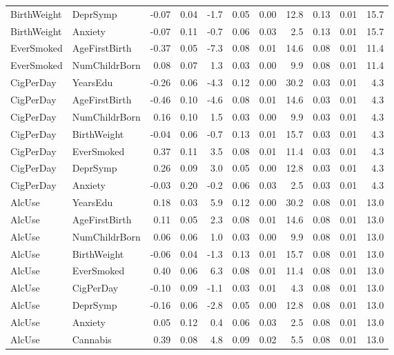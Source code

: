 \begin{longtable}{llrrrrrrrrr}
  BirthWeight & DeprSymp & -0.07 & 0.04 & -1.7 & 0.05 & 0.00 & 12.8 & 0.13 & 0.01 & 15.7 \\ 
  BirthWeight & Anxiety & -0.07 & 0.11 & -0.7 & 0.06 & 0.03 & 2.5 & 0.13 & 0.01 & 15.7 \\ 
  EverSmoked & AgeFirstBirth & -0.37 & 0.05 & -7.3 & 0.08 & 0.01 & 14.6 & 0.08 & 0.01 & 11.4 \\ 
  EverSmoked & NumChildrBorn & 0.08 & 0.07 & 1.3 & 0.03 & 0.00 & 9.9 & 0.08 & 0.01 & 11.4 \\ 
  CigPerDay & YearsEdu & -0.26 & 0.06 & -4.3 & 0.12 & 0.00 & 30.2 & 0.03 & 0.01 & 4.3 \\ 
  CigPerDay & AgeFirstBirth & -0.46 & 0.10 & -4.6 & 0.08 & 0.01 & 14.6 & 0.03 & 0.01 & 4.3 \\ 
  CigPerDay & NumChildrBorn & 0.16 & 0.10 & 1.5 & 0.03 & 0.00 & 9.9 & 0.03 & 0.01 & 4.3 \\ 
  CigPerDay & BirthWeight & -0.04 & 0.06 & -0.7 & 0.13 & 0.01 & 15.7 & 0.03 & 0.01 & 4.3 \\ 
  CigPerDay & EverSmoked & 0.37 & 0.11 & 3.5 & 0.08 & 0.01 & 11.4 & 0.03 & 0.01 & 4.3 \\ 
  CigPerDay & DeprSymp & 0.26 & 0.09 & 3.0 & 0.05 & 0.00 & 12.8 & 0.03 & 0.01 & 4.3 \\ 
  CigPerDay & Anxiety & -0.03 & 0.20 & -0.2 & 0.06 & 0.03 & 2.5 & 0.03 & 0.01 & 4.3 \\ 
  AlcUse & YearsEdu & 0.18 & 0.03 & 5.9 & 0.12 & 0.00 & 30.2 & 0.08 & 0.01 & 13.0 \\ 
  AlcUse & AgeFirstBirth & 0.11 & 0.05 & 2.3 & 0.08 & 0.01 & 14.6 & 0.08 & 0.01 & 13.0 \\ 
  AlcUse & NumChildrBorn & 0.06 & 0.06 & 1.0 & 0.03 & 0.00 & 9.9 & 0.08 & 0.01 & 13.0 \\ 
  AlcUse & BirthWeight & -0.06 & 0.04 & -1.3 & 0.13 & 0.01 & 15.7 & 0.08 & 0.01 & 13.0 \\ 
  AlcUse & EverSmoked & 0.40 & 0.06 & 6.3 & 0.08 & 0.01 & 11.4 & 0.08 & 0.01 & 13.0 \\ 
  AlcUse & CigPerDay & -0.10 & 0.09 & -1.1 & 0.03 & 0.01 & 4.3 & 0.08 & 0.01 & 13.0 \\ 
  AlcUse & DeprSymp & -0.16 & 0.06 & -2.8 & 0.05 & 0.00 & 12.8 & 0.08 & 0.01 & 13.0 \\ 
  AlcUse & Anxiety & 0.05 & 0.12 & 0.4 & 0.06 & 0.03 & 2.5 & 0.08 & 0.01 & 13.0 \\ 
  AlcUse & Cannabis & 0.39 & 0.08 & 4.8 & 0.09 & 0.02 & 5.5 & 0.08 & 0.01 & 13.0 \\ 

\end{longtable}
